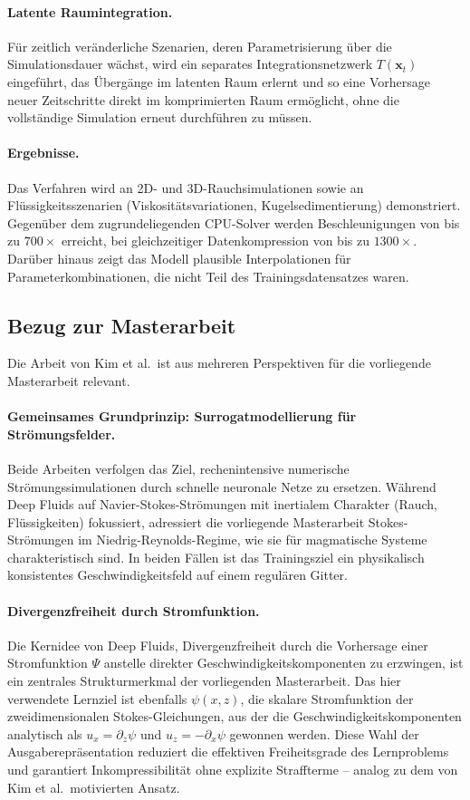 \documentclass[a4paper,12pt]{article}
\begin{document}
\paragraph{Latente Raumintegration.}
Für zeitlich veränderliche Szenarien, deren Parametrisierung über die Simulationsdauer
wächst, wird ein separates Integrationsnetzwerk $T(\mathbf{x}_t)$ eingeführt, das
Übergänge im latenten Raum erlernt und so eine Vorhersage neuer Zeitschritte direkt
im komprimierten Raum ermöglicht, ohne die vollständige Simulation erneut durchführen
zu müssen.

\paragraph{Ergebnisse.}
Das Verfahren wird an 2D- und 3D-Rauchsimulationen sowie an Flüssigkeitsszenarien
(Viskositätsvariationen, Kugelsedimentierung) demonstriert. Gegenüber dem zugrundeliegenden
CPU-Solver werden Beschleunigungen von bis zu $700\times$ erreicht, bei gleichzeitiger
Datenkompression von bis zu $1300\times$. Darüber hinaus zeigt das Modell plausible
Interpolationen für Parameterkombinationen, die nicht Teil des Trainingsdatensatzes waren.

\subsection*{Bezug zur Masterarbeit}

Die Arbeit von Kim et al.\ ist aus mehreren Perspektiven für die vorliegende Masterarbeit
relevant.

\paragraph{Gemeinsames Grundprinzip: Surrogatmodellierung für Strömungsfelder.}
Beide Arbeiten verfolgen das Ziel, rechenintensive numerische Strömungssimulationen
durch schnelle neuronale Netze zu ersetzen. Während Deep Fluids auf Navier-Stokes-Strömungen
mit inertialem Charakter (Rauch, Flüssigkeiten) fokussiert, adressiert die vorliegende
Masterarbeit Stokes-Strömungen im Niedrig-Reynolds-Regime, wie sie für magmatische Systeme
charakteristisch sind. In beiden Fällen ist das Trainingsziel ein physikalisch konsistentes
Geschwindigkeitsfeld auf einem regulären Gitter.

\paragraph{Divergenzfreiheit durch Stromfunktion.}
Die Kernidee von Deep Fluids, Divergenzfreiheit durch die Vorhersage einer Stromfunktion
$\Psi$ anstelle direkter Geschwindigkeitskomponenten zu erzwingen, ist ein zentrales
Strukturmerkmal der vorliegenden Masterarbeit. Das hier verwendete Lernziel ist
ebenfalls $\psi(x,z)$, die skalare Stromfunktion der zweidimensionalen Stokes-Gleichungen,
aus der die Geschwindigkeitskomponenten analytisch als $u_x = \partial_z\psi$ und
$u_z = -\partial_x\psi$ gewonnen werden. Diese Wahl der Ausgaberepräsentation
reduziert die effektiven Freiheitsgrade des Lernproblems und garantiert
Inkompressibilität ohne explizite Straffterme -- analog zu dem von Kim et al.\
motivierten Ansatz.
\end{document}
